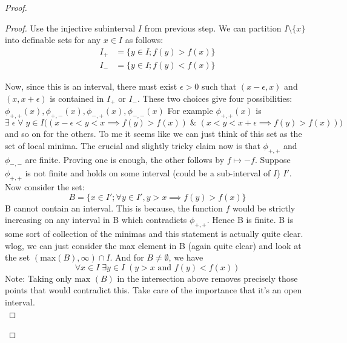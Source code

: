 \begin{definition}
\begin{proof}
\begin{proof}
        Use the injective subinterval $I$ from previous step. We can partition $I \setminus \{x\}$ into definable sets for any $x\in I$ as follows:
        \begin{align*}
            I_+ &= \{y\in I; f(y) > f(x)\} \\
            I_- &= \{y\in I; f(y) < f(x)\}
        \end{align*}

        Now, since this is an interval, there must exist $\epsilon > 0$ such that $(x-\epsilon, x)$ and $(x, x+\epsilon)$ is contained in $I_+$ or $I_-$. 
        These two choices give four possibilities: $\phi_{+,+}(x), \phi_{+,-}(x), \phi_{-,+}(x), \phi_{-,-}(x)$
        For example $\phi_{+,+}(x)$ is
        \begin{equation*}
            \exists\; \epsilon\; \forall \;y \in I \Big( (x-\epsilon<y<x\implies f(y)>f(x)) \; \& \; (x<y<x+\epsilon\implies f(y)>f(x)) \Big)
        \end{equation*} and so on for the others. 
        To me it seems like we can just think of this set as the set of local minima.
        The crucial and slightly tricky claim now is that $\phi_{+,+}$ and $\phi_{-,-}$ are finite. Proving one is enough, the other follows by $f\mapsto -f$.
        Suppose $\phi_{+,+}$ is not finite and holds on some interval (could be a sub-interval of $I$) $I'$. Now consider the set:
        \begin{equation*}
            B = \{x\in I';\forall y\in I', y>x\implies f(y) > f(x)\}
        \end{equation*}
        B cannot contain an interval. This is because, the function $f$ would be strictly increasing on any interval in B which contradicts $\phi_{+,+}$. Hence B is finite. B is some sort of collection of the minimas and this statement is actually quite clear.
        \\ wlog, we can just consider the max element in B (again quite clear) and look at the set \newline $(\text{max}(B), \infty)\cap I$. And for $B\neq\emptyset$, we have
        \begin{equation}
        \label{prop}
            \forall x \in I\;\exists y\in I \;(y>x \text{ and } f(y) < f(x))
        \end{equation}
        Note: Taking only $\text{max }(B)$ in the intersection above removes precisely those points that would contradict this. Take care of the importance that it's an open interval.
        \begin{equation*}

\end{equation*}
\end{proof}
\end{proof}
\end{definition}
